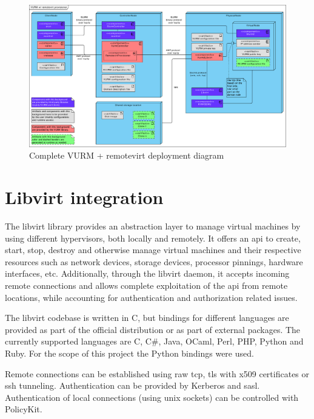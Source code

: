 \begin{landscape}
	\begin{figure}
		\centering
		\includegraphics[height=.85\textheight]{figures/cluster-deployment}
		\caption{Complete VURM + remotevirt deployment diagram}
		\label{fig:remotevirt-deploy}
	\end{figure}
\end{landscape}


\section{Libvirt integration}
\label{sec:libvirt-integration}

The libvirt library provides an abstraction layer to manage virtual machines by using different hypervisors, both locally and remotely. It offers an \gls{api} to create, start, stop, destroy and otherwise manage virtual machines and their respective resources such as network devices, storage devices, processor pinnings, hardware interfaces, etc. Additionally, through the libvirt daemon, it accepts incoming remote connections and allows complete exploitation of the \gls{api} from remote locations, while accounting for authentication and authorization related issues.

The libvirt codebase is written in C, but bindings for different languages are provided as part of the official distribution or as part of external packages. The currently supported languages are C, C\#, Java, OCaml, Perl, PHP, Python and Ruby. For the scope of this project the Python bindings were used.

Remote connections can be established using raw \gls{tcp}, \gls{tls} with x509 certificates or \gls{ssh} tunneling. Authentication can be provided by Kerberos and \gls{sasl}. Authentication of local connections (using unix sockets) can be controlled with PolicyKit.

